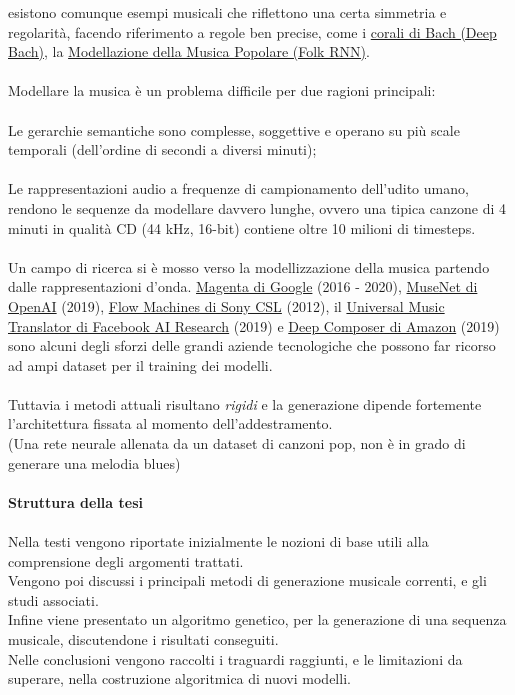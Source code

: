 \documentclass[a4paper,12pt]{report}
\begin{document}
esistono comunque esempi musicali che riflettono una certa simmetria e regolarità, facendo riferimento a regole ben precise, come i \href{https://youtu.be/QiBM7-5hA6o}{corali di Bach (Deep Bach)}, la \href{https://folkrnn.org}{Modellazione della Musica Popolare (Folk RNN)}. \\
\\
Modellare la musica è un problema difficile per due ragioni principali: \\
\\
Le gerarchie semantiche sono complesse, soggettive e operano su più scale temporali (dell'ordine di secondi a diversi minuti); \\
\\
Le rappresentazioni audio a frequenze di campionamento dell'udito umano, rendono le sequenze da modellare davvero lunghe, ovvero una tipica canzone di 4 minuti in qualità CD (44 kHz, 16-bit) contiene oltre 10 milioni di timesteps. \\
\\
Un campo di ricerca si è mosso verso la modellizzazione della musica partendo dalle rappresentazioni d'onda.
\href{https://magenta.tensorflow.org }{Magenta di Google} (2016 - 2020), \href{https://openai.com/index/musenet/}{MuseNet di OpenAI} (2019), \href{https://www.flow-machines.com}{Flow Machines di Sony CSL} (2012), il \href{https://ai.meta.com/research/publications/a-universal-music-translation-network/}{Universal Music Translator di Facebook AI Research} (2019) e \href{https://aws.amazon.com/it/deepcomposer/}{Deep Composer di Amazon} (2019)
sono alcuni degli sforzi delle grandi aziende tecnologiche che possono far ricorso ad ampi dataset per il training dei modelli. \\ 
\\
Tuttavia i metodi attuali risultano \textit{rigidi} e la generazione dipende fortemente l'architettura fissata al momento dell'addestramento. \\
(Una rete neurale allenata da un dataset di canzoni pop, non è in grado di generare una melodia blues) \\
\\
\textbf{Struttura della tesi} \\
\\
Nella testi vengono riportate inizialmente le nozioni di base utili alla comprensione degli argomenti trattati. \\
Vengono poi discussi i principali metodi di generazione musicale correnti, e gli studi associati. \\
Infine viene presentato un algoritmo genetico, per la generazione di una sequenza musicale, discutendone i risultati conseguiti. \\
Nelle conclusioni vengono raccolti i traguardi raggiunti, e le limitazioni da superare, nella costruzione algoritmica di nuovi modelli. \\
\end{document}
